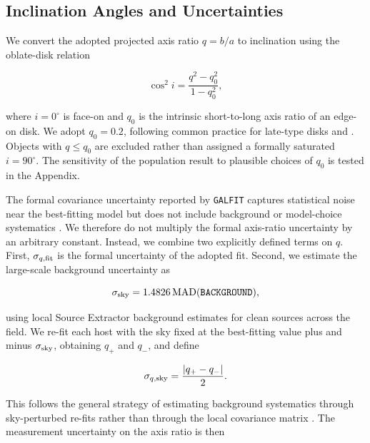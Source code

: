 \documentclass[10pt,twocolumn]{article}
\begin{document}
\subsection{Inclination Angles and Uncertainties}
\label{subsec:inclination}

We convert the adopted projected axis ratio $q=b/a$ to inclination using the
oblate-disk relation \citep{1926ApJ....64..321H}

\begin{equation}
\cos^2 i = \frac{q^2-q_0^2}{1-q_0^2},
\label{eq:hubble_inclination}
\end{equation}

where $i=0^\circ$ is face-on and $q_0$ is the intrinsic short-to-long axis
ratio of an edge-on disk.  We adopt $q_0=0.2$, following common practice for
late-type disks and \citet{2024Natur.634.1065B}.  Objects with $q\leq q_0$
are excluded rather than assigned a formally saturated $i=90^\circ$.
The sensitivity of the population result to plausible choices of $q_0$ is
tested in the Appendix.

The formal covariance uncertainty reported by \texttt{GALFIT} captures
statistical noise near the best-fitting model but does not include background
or model-choice systematics \citep{2010AJ....139.2097P,2007ApJS..172..615H}.
We therefore do not multiply the formal axis-ratio uncertainty by an arbitrary
constant.  Instead, we combine two explicitly defined terms on $q$.  First,
$\sigma_{q,\rm fit}$ is the formal uncertainty of the adopted fit.  Second,
we estimate the large-scale background uncertainty as

\begin{equation}
\sigma_{\rm sky}=1.4826\,{\rm MAD}(\texttt{BACKGROUND}),
\end{equation}

using local Source Extractor background estimates for clean sources across the
field.  We re-fit each host with the sky fixed at the best-fitting value plus
and minus $\sigma_{\rm sky}$, obtaining $q_+$ and $q_-$, and define

\begin{equation}
\sigma_{q,\rm sky}=\frac{|q_+-q_-|}{2}.
\end{equation}

This follows the general strategy of estimating background systematics through
sky-perturbed re-fits rather than through the local covariance matrix
\citep{2013ApJ...766...47H,2017ApJ...845..114G}.  The measurement uncertainty
on the axis ratio is then
\end{document}
